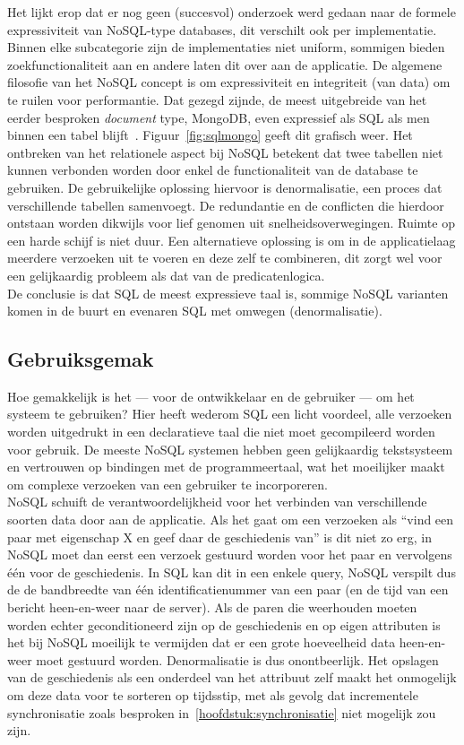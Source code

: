 Het lijkt erop dat er nog geen (succesvol) onderzoek werd gedaan naar de formele expressiviteit van NoSQL-type databases, dit verschilt ook per implementatie. Binnen elke subcategorie zijn de implementaties niet uniform, sommigen bieden zoekfunctionaliteit aan en andere laten dit over aan de applicatie. De algemene filosofie van het NoSQL concept is om expressiviteit en integriteit (van data) om te ruilen voor performantie. Dat gezegd zijnde, de meest uitgebreide van het eerder besproken \emph{document} type, MongoDB, even expressief als SQL als men binnen een tabel blijft~\cite{sqlnosql}. Figuur~\ref{fig:sqlmongo} geeft dit grafisch weer. Het ontbreken van het relationele aspect bij NoSQL betekent dat twee tabellen niet kunnen verbonden worden door enkel de functionaliteit van de database te gebruiken. De gebruikelijke oplossing hiervoor is denormalisatie, een proces dat verschillende tabellen samenvoegt. De redundantie en de conflicten die hierdoor ontstaan worden dikwijls voor lief genomen uit snelheidsoverwegingen. Ruimte op een harde schijf is niet duur. Een alternatieve oplossing is om in de applicatielaag meerdere verzoeken uit te voeren en deze zelf te combineren, dit zorgt wel voor een gelijkaardig probleem als dat van de predicatenlogica.\\

De conclusie is dat SQL de meest expressieve taal is, sommige NoSQL varianten komen in de buurt en evenaren SQL met omwegen (denormalisatie).

\subsection{Gebruiksgemak}
Hoe gemakkelijk is het --- voor de ontwikkelaar en de gebruiker --- om het systeem te gebruiken? Hier heeft wederom SQL een licht voordeel, alle verzoeken worden uitgedrukt in een declaratieve taal die niet moet gecompileerd worden voor gebruik. De meeste NoSQL systemen hebben geen gelijkaardig tekstsysteem en vertrouwen op bindingen met de programmeertaal, wat het moeilijker maakt om complexe verzoeken van een gebruiker te incorporeren.\\

NoSQL schuift de verantwoordelijkheid voor het verbinden van verschillende soorten data door aan de applicatie. Als het gaat om een verzoeken als ``vind een paar met eigenschap X en geef daar de geschiedenis van'' is dit niet zo erg, in NoSQL moet dan eerst een verzoek gestuurd worden voor het paar en vervolgens \'e\'en voor de geschiedenis. In SQL kan dit in een enkele query, NoSQL verspilt dus de de bandbreedte van \'e\'en identificatienummer van een paar (en de tijd van een bericht heen-en-weer naar de server). Als de paren die weerhouden moeten worden echter geconditioneerd zijn op de geschiedenis en op eigen attributen is het bij NoSQL moeilijk te vermijden dat er een grote hoeveelheid data heen-en-weer moet gestuurd worden. Denormalisatie is dus onontbeerlijk. Het opslagen van de geschiedenis als een onderdeel van het attribuut zelf maakt het onmogelijk om deze data voor te sorteren op tijdsstip, met als gevolg dat incrementele synchronisatie zoals besproken in~\ref{hoofdstuk:synchronisatie} niet mogelijk zou zijn.

